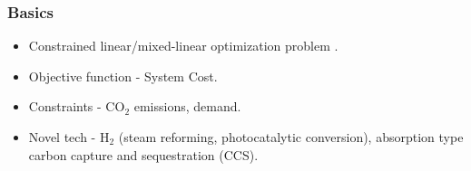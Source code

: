 \begin{frame}
  \frametitle{Basics}
        \begin{itemize}
        
        \item Constrained linear/mixed-linear optimization problem \cite{loulou_etsap-tiam:_2008}.
        
        \item Objective function - System Cost.
        
        \item Constraints - CO$_2$ emissions, demand.
        
        \item Novel tech - H$_2$ (steam reforming, photocatalytic conversion), absorption type carbon capture and sequestration (CCS)\cite{kato_energy_2016}.
        
        \end{itemize}
\end{frame}

\begin{frame}

\end{frame}